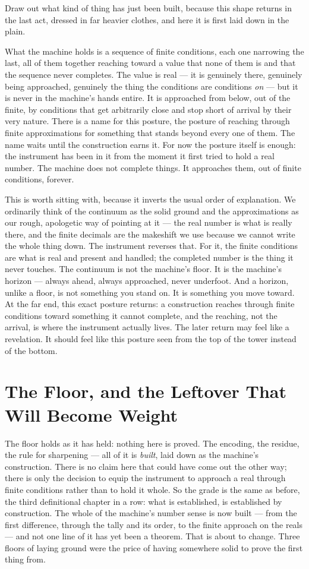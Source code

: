 Draw out what kind of thing has just been built, because this shape returns in the last act, dressed in far
heavier clothes, and here it is first laid down in the plain.

What the machine holds is a sequence of finite conditions, each one narrowing the last, all of them together
reaching toward a value that none of them is and that the sequence never completes. The value is real --- it is
genuinely there, genuinely being approached, genuinely the thing the conditions are conditions \emph{on} --- but
it is never in the machine's hands entire. It is approached from below, out of the finite, by conditions that get
arbitrarily close and stop short of arrival by their very nature. There is a name for this posture, the posture
of reaching through finite approximations for something that stands beyond every one of them. The name waits
until the construction earns it. For now the posture itself is enough: the instrument has been in it from the
moment it first tried to hold a real number. The machine does not complete things. It approaches them, out of
finite conditions, forever.

This is worth sitting with, because it inverts the usual order of explanation. We ordinarily think of the
continuum as the solid ground and the approximations as our rough, apologetic way of pointing at it --- the real
number is what is really there, and the finite decimals are the makeshift we use because we cannot write the
whole thing down. The instrument reverses that. For it, the finite conditions are what is real and present and
handled; the completed number is the thing it never touches. The continuum is not the machine's floor. It is the
machine's horizon --- always ahead, always approached, never underfoot. And a horizon, unlike a floor, is not
something you stand on. It is something you move toward. At the far end, this exact posture returns: a
construction reaches through finite conditions toward something it cannot complete, and the reaching, not the
arrival, is where the instrument actually lives. The later return may feel like a revelation. It should feel like
this posture seen from the top of the tower instead of the bottom.

\section{The Floor, and the Leftover That Will Become Weight}

The floor holds as it has held: nothing here is proved. The encoding, the residue, the rule for sharpening ---
all of it is \emph{built}, laid down as the machine's construction. There is no claim here that could
have come out the other way; there is only the decision to equip the instrument to approach a real through finite
conditions rather than to hold it whole. So the grade is the same as before, the third definitional chapter in a
row: what is established, is established by construction. The whole of the machine's number sense is now built
--- from the first difference, through the tally and its order, to the finite approach on the reals --- and not
one line of it has yet been a theorem. That is about to change. Three floors of laying ground were the price of
having somewhere solid to prove the first thing from.

